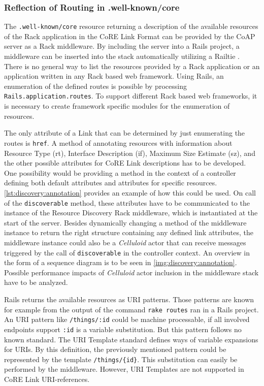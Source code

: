 		\subsubsection{Reflection of Routing in .well-known/core}
		\label{cha:design:protocol:link}

			The \texttt{.well-known/core} resource returning a description of
			the available resources of the Rack application in the \ac{CoRE}
			Link Format \cite{link} can be provided by the \ac{CoAP} server as
			a Rack middleware. By including the server into a \ac{Rails}
			project, a middleware can be inserted into the stack automatically
			utilizing a Railtie \cite{railtie}. There is no general way to list
			the resources provided by a Rack application or an application
			written in any Rack based web framework. Using \ac{Rails}, an
			enumeration of the defined routes is possible by processing
			\texttt{Rails.application.routes}. To support different Rack based
			web frameworks, it is necessary to create framework specific
			modules for the enumeration of resources.

			The only attribute of a Link that can be determined by just
			enumerating the routes is \texttt{href}. A method of annotating
			resources with information about Resource Type (rt), Interface
			Description (if), Maximum Size Estimate (sz), and the other
			possible attributes for CoRE Link descriptions has to be developed.
			One possibility would be providing a method in the context of a
			controller defining both default attributes and attributes for
			specific resources. \autoref{lst:discovery:annotation} provides an
			example of how this could be used. On call of the
			\texttt{discoverable} method, these attributes have to be
			communicated to the instance of the Resource Discovery Rack
			middleware, which is instantiated at the start of the server.
			Besides dynamically changing a method of the middleware instance to
			return the right structure containing any defined link attributes,
			the middleware instance could also be a \emph{Celluloid} actor that
			can receive messages triggered by the call of \texttt{discoverable}
			in the controller context. An overview in the form of a sequence
			diagram is to be seen in \autoref{img:discovery:annotation}.
			Possible performance impacts of \emph{Celluloid} actor inclusion in
			the middleware stack have to be analyzed.

			\ac{Rails} returns the available resources as \ac{URI} patterns.
			Those patterns are known for example from the output of the command
			\texttt{rake routes} ran in a \ac{Rails} project. An \ac{URI}
			pattern like \texttt{/things/:id} could be machine processable, if
			all involved endpoints support \texttt{:id} is a variable
			substitution. But this pattern follows no known standard. The
			\ac{URI} Template standard \cite{uri-template} defines ways of
			variable expansions for \acp{URI}. By this definition, the
			previously mentioned pattern could be represented by the template
			\texttt{/things/\{id\}}. This substitution can easily be performed
			by the middleware. However, \ac{URI} Templates are not supported in
			\ac{CoRE} Link \ac{URI}-references.
 
